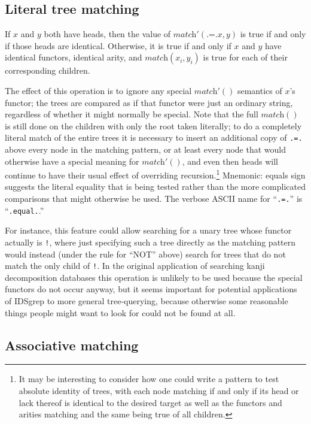 \documentclass[twocolumn]{report}
\begin{document}
\subsection{Literal tree matching}

If $x$ and $y$ both have heads, then the value of
$\textit{match}'(\texttt{.=.}x,y)$ is true if and only if those heads are
identical.  Otherwise, it is true if and only if $x$ and $y$ have identical
functors, identical arity, and $\textit{match}(x_i,y_i)$ is true for each of
their corresponding children.

The effect of this operation is to ignore any special $\textit{match}'()$
semantics of $x$'s functor; the trees are compared as if that functor were
just an ordinary string, regardless of whether it might normally be special. 
Note that the full $\textit{match}()$ is still done on the children with
only the root taken literally; to do a completely literal match of the
entire trees it is necessary to insert an additional copy of \texttt{.=.}
above every node in the matching pattern, or at least every node that would
otherwise have a special meaning for $\textit{match}'()$, and even then
heads will continue to have their usual effect of overriding
recursion.\footnote{It may be interesting to consider how one could write a
pattern to test absolute identity of trees, with each node matching if and
only if its head or lack thereof is identical to the desired target as well
as the functors and arities matching and the same being true of all
children.} Mnemonic: equals sign suggests the literal equality that is being
tested rather than the more complicated comparisons that might otherwise be
used.
The verbose ASCII name for ``\texttt{.=.}'' is ``\texttt{.equal.}.''

For instance, this feature could allow searching for a unary tree whose
functor actually is \texttt{!}, where just specifying such a tree directly
as the matching pattern would instead (under the rule for ``NOT'' above)
search for trees that do not match the only child of \texttt{!}.  In the
original application of searching kanji decomposition databases this
operation is unlikely to be used because the special functors do not occur
anyway, but it seems important for potential applications of IDSgrep to more
general tree-querying, because otherwise some reasonable things people might
want to look for could not be found at all.

\subsection{Associative matching}
\end{document}
